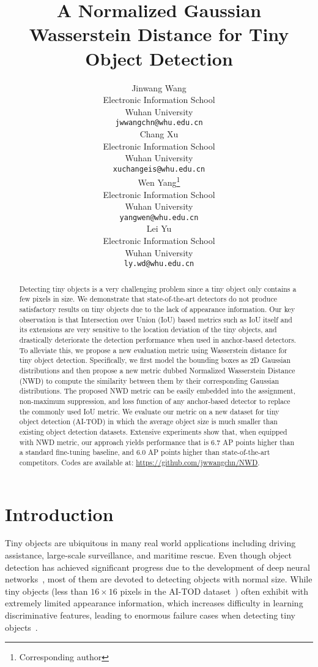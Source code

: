 \documentclass{article}
\title{A Normalized Gaussian Wasserstein Distance for Tiny Object Detection}
\author{Jinwang Wang \\
  Electronic Information School\\
  Wuhan University\\
  \texttt{jwwangchn@whu.edu.cn} \\
\And
  Chang Xu \\
  Electronic Information School\\
  Wuhan University\\
  \texttt{xuchangeis@whu.edu.cn} \\
  \And
  Wen Yang\thanks{Corresponding author} \\
  Electronic Information School\\
  Wuhan University\\
  \texttt{yangwen@whu.edu.cn} \\
  \And
  Lei Yu \\
  Electronic Information School\\
  Wuhan University\\
  \texttt{ly.wd@whu.edu.cn} \\
}
\begin{document}
\maketitle

\begin{abstract}
Detecting tiny objects is a very challenging problem since a tiny object only contains a few pixels in size. We demonstrate that state-of-the-art detectors do not produce satisfactory results on tiny objects due to the lack of appearance information. Our key observation is that Intersection over Union (IoU) based metrics such as IoU itself and its extensions are very sensitive to the location deviation of the tiny objects, and drastically deteriorate the detection performance when used in anchor-based detectors. To alleviate this, we propose a new evaluation metric using Wasserstein distance for tiny object detection. Specifically, we first model the bounding boxes as 2D Gaussian distributions and then propose a new metric dubbed Normalized Wasserstein Distance (NWD) to compute the similarity between them by their corresponding Gaussian distributions. The proposed NWD metric can be easily embedded into the assignment, non-maximum suppression, and loss function of any anchor-based detector to replace the commonly used IoU metric. We evaluate our metric on a new dataset for tiny object detection (AI-TOD) in which the average object size is much smaller than existing object detection datasets. Extensive experiments show that, when equipped with NWD metric, our approach yields performance that is 6.7 AP points higher than a standard fine-tuning baseline, and 6.0 AP points higher than state-of-the-art competitors. Codes are available at: \url{https://github.com/jwwangchn/NWD}.

\end{abstract}

\section{Introduction}

Tiny objects are ubiquitous in many real world applications including driving assistance, large-scale surveillance, and maritime rescue. Even though object detection has achieved significant progress due to the development of deep neural networks~\cite{Faster-R-CNN_2015_NIPS,Focal-Loss_2017_ICCV,FCOS_2019_ICCV}, most of them are devoted to detecting objects with normal size. While tiny objects (less than $16\times 16$ pixels in the AI-TOD dataset~\cite{AI-TOD_2020_ICPR}) often exhibit with extremely limited appearance information, which increases difficulty in learning discriminative features, leading to enormous failure cases when detecting tiny objects~\cite{SNIPER_2018_NIPS,AI-TOD_2020_ICPR,TinyPerson_2020_WACV}.
\end{document}
